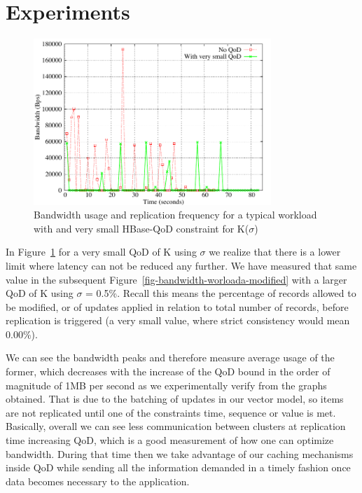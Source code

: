 \section{Experiments}

\begin{figure}[h]
\centering
\includegraphics[width=0.8\textwidth]{figs/bandwidth.pdf}
\caption{Bandwidth usage and replication frequency for a typical workload with and very small HBase-QoD constraint for K($\sigma$)}
\label{fig-bw-freq}
\end{figure}

In Figure~\ref{fig-bw-freq} for a very small QoD of K using $\sigma$ we realize that there is a lower limit where latency can not be reduced any further. We have measured that same value in the subsequent Figure~\ref{fig-bandwidth-worloada-modified} with a larger QoD of K using $\sigma$ = 0.5\%. Recall this means the percentage of records allowed to be modified, or of updates applied in relation to total number of records, before replication is triggered (a very small value, where strict consistency would mean 0.00\%).

We can see the bandwidth peaks and therefore measure average usage of the former, which decreases with the increase of the QoD bound in the order of magnitude of 1MB per second as we experimentally verify from the graphs obtained. That is due to the batching of updates in our vector model, so items are not replicated until one of the constraints time, sequence or value is met. Basically, overall we can see less communication between clusters at replication time increasing QoD, which is a good measurement of how one can optimize bandwidth. During that time then we take advantage of our caching mechanisms inside QoD while sending all the information demanded in a timely fashion once data becomes necessary to the application.

